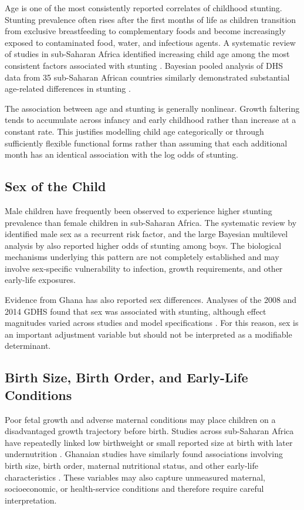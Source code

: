 Age is one of the most consistently reported correlates of childhood stunting. Stunting prevalence often rises after the first months of life as children transition from exclusive breastfeeding to complementary foods and become increasingly exposed to contaminated food, water, and infectious agents. A systematic review of studies in sub-Saharan Africa identified increasing child age among the most consistent factors associated with stunting \cite{AkombiEtAl2017}. Bayesian pooled analysis of DHS data from 35 sub-Saharan African countries similarly demonstrated substantial age-related differences in stunting \cite{TakeleEtAl2022}.

The association between age and stunting is generally nonlinear. Growth faltering tends to accumulate across infancy and early childhood rather than increase at a constant rate. This justifies modelling child age categorically or through sufficiently flexible functional forms rather than assuming that each additional month has an identical association with the log odds of stunting.

\subsection{Sex of the Child}

Male children have frequently been observed to experience higher stunting prevalence than female children in sub-Saharan Africa. The systematic review by \citet{AkombiEtAl2017} identified male sex as a recurrent risk factor, and the large Bayesian multilevel analysis by \citet{TakeleEtAl2022} also reported higher odds of stunting among boys. The biological mechanisms underlying this pattern are not completely established and may involve sex-specific vulnerability to infection, growth requirements, and other early-life exposures.

Evidence from Ghana has also reported sex differences. Analyses of the 2008 and 2014 GDHS found that sex was associated with stunting, although effect magnitudes varied across studies and model specifications \cite{AhetoEtAl2015,DartehEtAl2014,BoahEtAl2019}. For this reason, sex is an important adjustment variable but should not be interpreted as a modifiable determinant.

\subsection{Birth Size, Birth Order, and Early-Life Conditions}

Poor fetal growth and adverse maternal conditions may place children on a disadvantaged growth trajectory before birth. Studies across sub-Saharan Africa have repeatedly linked low birthweight or small reported size at birth with later undernutrition \cite{AkombiEtAl2017,TakeleEtAl2022}. Ghanaian studies have similarly found associations involving birth size, birth order, maternal nutritional status, and other early-life characteristics \cite{BoahEtAl2019}. These variables may also capture unmeasured maternal, socioeconomic, or health-service conditions and therefore require careful interpretation.

